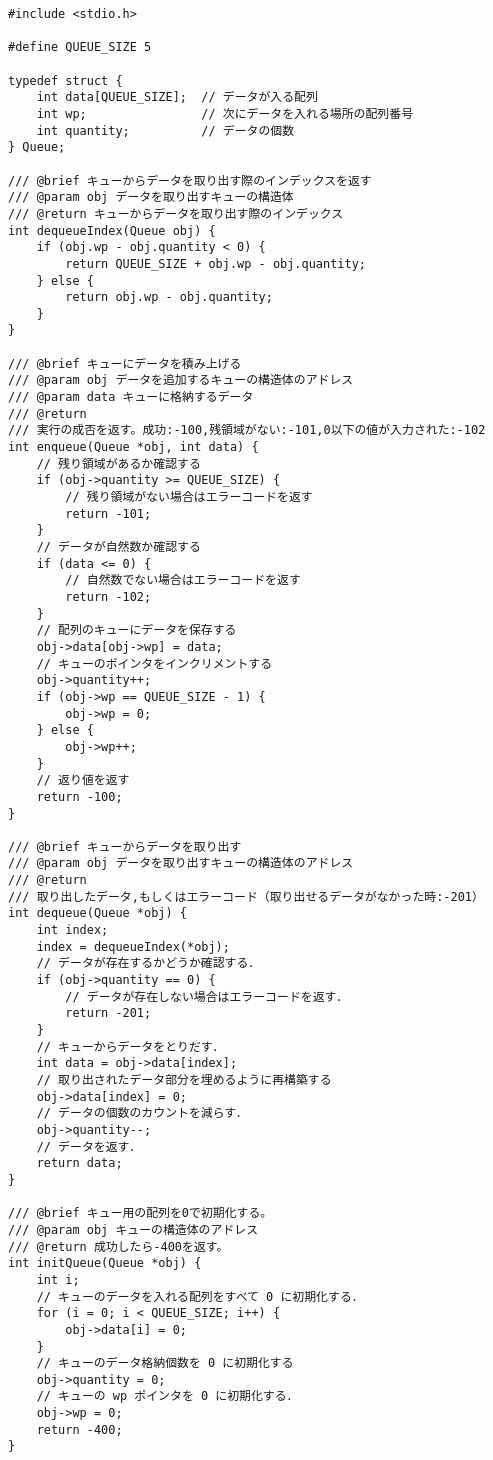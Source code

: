 \documentclass[a4j]{jarticle}
\begin{document}
\begin{lstlisting}[caption=リングキューのプログラム,label=ringqueue]
  #include <stdio.h>

#define QUEUE_SIZE 5

typedef struct {
    int data[QUEUE_SIZE];  // データが入る配列
    int wp;                // 次にデータを入れる場所の配列番号
    int quantity;          // データの個数
} Queue;

/// @brief キューからデータを取り出す際のインデックスを返す
/// @param obj データを取り出すキューの構造体
/// @return キューからデータを取り出す際のインデックス
int dequeueIndex(Queue obj) {
    if (obj.wp - obj.quantity < 0) {
        return QUEUE_SIZE + obj.wp - obj.quantity;
    } else {
        return obj.wp - obj.quantity;
    }
}

/// @brief キューにデータを積み上げる
/// @param obj データを追加するキューの構造体のアドレス
/// @param data キューに格納するデータ
/// @return
/// 実行の成否を返す。成功:-100,残領域がない:-101,0以下の値が入力された:-102
int enqueue(Queue *obj, int data) {
    // 残り領域があるか確認する
    if (obj->quantity >= QUEUE_SIZE) {
        // 残り領域がない場合はエラーコードを返す
        return -101;
    }
    // データが自然数か確認する
    if (data <= 0) {
        // 自然数でない場合はエラーコードを返す
        return -102;
    }
    // 配列のキューにデータを保存する
    obj->data[obj->wp] = data;
    // キューのポインタをインクリメントする
    obj->quantity++;
    if (obj->wp == QUEUE_SIZE - 1) {
        obj->wp = 0;
    } else {
        obj->wp++;
    }
    // 返り値を返す
    return -100;
}

/// @brief キューからデータを取り出す
/// @param obj データを取り出すキューの構造体のアドレス
/// @return
/// 取り出したデータ,もしくはエラーコード（取り出せるデータがなかった時:-201）
int dequeue(Queue *obj) {
    int index;
    index = dequeueIndex(*obj);
    // データが存在するかどうか確認する．
    if (obj->quantity == 0) {
        // データが存在しない場合はエラーコードを返す．
        return -201;
    }
    // キューからデータをとりだす．
    int data = obj->data[index];
    // 取り出されたデータ部分を埋めるように再構築する
    obj->data[index] = 0;
    // データの個数のカウントを減らす．
    obj->quantity--;
    // データを返す．
    return data;
}

/// @brief キュー用の配列を0で初期化する。
/// @param obj キューの構造体のアドレス
/// @return 成功したら-400を返す。
int initQueue(Queue *obj) {
    int i;
    // キューのデータを入れる配列をすべて 0 に初期化する．
    for (i = 0; i < QUEUE_SIZE; i++) {
        obj->data[i] = 0;
    }
    // キューのデータ格納個数を 0 に初期化する
    obj->quantity = 0;
    // キューの wp ポインタを 0 に初期化する．
    obj->wp = 0;
    return -400;
}


\end{lstlisting}
\end{document}
